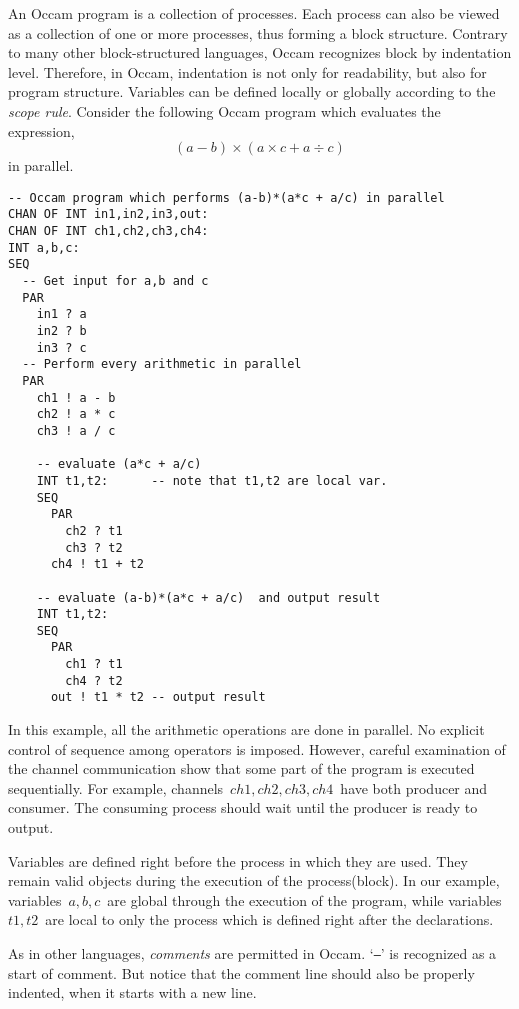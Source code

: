 \par
An Occam program is a collection of processes.  Each process can also
be viewed as a collection of one or more processes, thus forming a
block structure.  Contrary to many other block-structured languages,
Occam recognizes block by indentation level.  Therefore, in Occam,
indentation is not only for readability, but also for program structure.
Variables can be defined locally or globally according to
the {\em scope rule}.  Consider
the following Occam program which evaluates the expression,
\[
	(a - b) \times (a \times c + a \div c)
\]
in parallel.
\begin{lin}
\begin{verbatim}
-- Occam program which performs (a-b)*(a*c + a/c) in parallel
CHAN OF INT in1,in2,in3,out:
CHAN OF INT ch1,ch2,ch3,ch4:
INT a,b,c:
SEQ
  -- Get input for a,b and c
  PAR
    in1 ? a
    in2 ? b
    in3 ? c
  -- Perform every arithmetic in parallel
  PAR
    ch1 ! a - b
    ch2 ! a * c
    ch3 ! a / c

    -- evaluate (a*c + a/c)
    INT t1,t2:		-- note that t1,t2 are local var.
    SEQ
      PAR
        ch2 ? t1
        ch3 ? t2
      ch4 ! t1 + t2

    -- evaluate (a-b)*(a*c + a/c)  and output result
    INT t1,t2:
    SEQ
      PAR
        ch1 ? t1
        ch4 ? t2
      out ! t1 * t2	-- output result
\end{verbatim}
\end{lin}

In this example, all the arithmetic operations are done in parallel.
No explicit control of sequence among operators is imposed.  However,
careful examination of the channel communication show that some
part of the program is executed sequentially.  For example, channels\
$ch1,ch2,ch3,ch4$\ have both producer and consumer.  The consuming
process should wait until the producer is ready to output.  

Variables are defined right before the process in which they are used.
They remain valid objects during the execution of the process(block).
In our example, variables\ $a,b,c$\ are global through the execution of
the program, while variables\ $t1,t2$\ are local to only the process
which is defined right after the declarations.

As in other languages, {\em comments} are permitted in  Occam.
`{\tt --}' is recognized as a start of comment.  But notice that the
comment line should also be properly indented, when it starts with a
new line.



